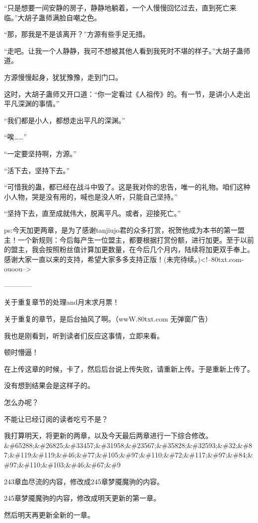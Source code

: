 \begin{this_body}
“只是想要一间安静的房子，静静地躺着，一个人慢慢回忆过去，直到死亡来临。”大胡子蛊师满脸自嘲之色。

“那，那我是不是该离开？”方源有些手足无措。

“走吧。让我一个人静静，我可不想被其他人看到我死时不堪的样子。”大胡子蛊师道。

方源慢慢起身，犹犹豫豫，走到门口。

这时，大胡子蛊师又开口道：“你一定看过《人祖传》的。有一节，是讲小人走出平凡深渊的事情。”

“我们都是小人，都想走出平凡的深渊。”

“唉……”

“一定要坚持啊，方源。”

“活下去，坚持下去。”

“可惜我的蛊，都已经在战斗中毁了。这是我对你的忠告，唯一的礼物。咱们这种小人物，哭是没有用的，喊也是没人听，只能自己坚持。”

“坚持下去，直至成就伟大，脱离平凡。或者，迎接死亡。”

ps:今天加更两章，是为了感谢tanjiujo君的众多打赏，祝贺他成为本书的第一盟主！一个新规则：今后每产生一位盟主，都要根据打赏份额，进行加更。至于以前的盟主，我会按照粉丝值计算加更数量，在今后几个月内，陆续将加更双手奉上。感谢大家一直以来的支持，希望大家多多支持正版！(未完待续。)<!--80txt.com-ouoou-->

------------

关于重复章节的处理and月末求月票！

关于重复的章节，是后台抽风了啊。（wwW.80txt.com 无弹窗广告）

我也是刚看到，听到读者们反应这事情，立即来看。

顿时懵逼！

在上传这章的时候，卡了，然后后台说上传失败，请重新上传。于是重新上传了。

没有想到结果会是这样子的。

怎么办呢？

不能让已经订阅的读者吃亏不是？

我打算明天，将更新的两章，以及今天最后两章进行一下综合修改。\&\#65288;\&\#26825;\&\#33457;\&\#31958;\&\#23567;\&\#35828;\&\#32593;\&\#32;\&\#87;\&\#119;\&\#119;\&\#46;\&\#77;\&\#105;\&\#97;\&\#110;\&\#72;\&\#117;\&\#97;\&\#84;\&\#97;\&\#110;\&\#103;\&\#46;\&\#67;\&\#9

243章血尽流的内容，修改成245章梦魇魔驹的内容。

245章梦魇魔驹的内容，修改成明天更新的第一章。

然后明天再更新全新的一章。


\end{this_body}
